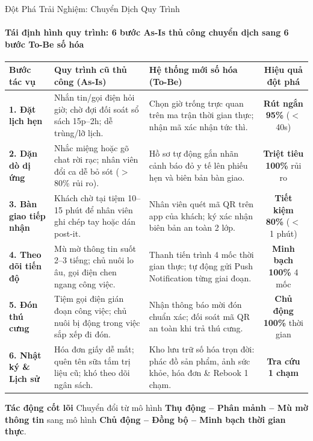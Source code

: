 \begin{frame}{Đột Phá Trải Nghiệm: Chuyển Dịch Quy Trình}
  \framesubtitle{\color{PetcareSecondary}\textbf{Tái định hình quy trình: 6 bước As-Is thủ công chuyển dịch sang 6 bước To-Be số hóa}}

  \begin{table}
    \centering
    \tiny
    \renewcommand{\arraystretch}{1.25}
    \begin{tabularx}{\textwidth}{|l|X|X|c|}
      \hline
      \rowcolor{PetcarePrimary!15}
      \textbf{Bước tác vụ} & \textbf{Quy trình cũ thủ công (As-Is)} & \textbf{Hệ thống mới số hóa (To-Be)} & \textbf{Hiệu quả đột phá} \\ \hline
      \textbf{1. Đặt lịch hẹn} & Nhắn tin/gọi điện hỏi giờ; chờ đợi đối soát sổ sách 15p--2h; dễ trùng/lỡ lịch. & Chọn giờ trống trực quan trên ma trận thời gian thực; nhận mã xác nhận tức thì. & \textbf{\color{PetcareSuccess}Rút ngắn 95\%} ($<$ 40s) \\ \hline
      \textbf{2. Dặn dò dị ứng} & Nhắc miệng hoặc gõ chat rời rạc; nhân viên đổi ca dễ bỏ sót ($>$ 80\% rủi ro). & Hồ sơ tự động gắn nhãn cảnh báo đỏ y tế lên phiếu hẹn và biên bản bàn giao. & \textbf{\color{PetcareSuccess}Triệt tiêu 100\%} rủi ro \\ \hline
      \textbf{3. Bàn giao tiếp nhận} & Khách chờ tại tiệm 10--15 phút để nhân viên ghi chép tay hoặc dán post-it. & Nhân viên quét mã QR trên app của khách; ký xác nhận biên bản an toàn 2 lớp. & \textbf{\color{PetcareSuccess}Tiết kiệm 80\%} ($<$ 1 phút) \\ \hline
      \textbf{4. Theo dõi tiến độ} & Mù mờ thông tin suốt 2--3 tiếng; chủ nuôi lo âu, gọi điện chen ngang công việc. & Thanh tiến trình 4 mốc thời gian thực; tự động gửi Push Notification từng giai đoạn. & \textbf{\color{PetcareSuccess}Minh bạch 100\%} 4 mốc \\ \hline
      \textbf{5. Đón thú cưng} & Tiệm gọi điện gián đoạn công việc; chủ nuôi bị động trong việc sắp xếp đi đón. & Nhận thông báo mời đón chuẩn xác; đối soát mã QR an toàn khi trả thú cưng. & \textbf{\color{PetcareSuccess}Chủ động 100\%} thời gian \\ \hline
      \textbf{6. Nhật ký \& Lịch sử} & Hóa đơn giấy dễ mất; quên tên sữa tắm trị liệu cũ; khó theo dõi ngân sách. & Kho lưu trữ số hóa trọn đời: phác đồ sản phẩm, ảnh sức khỏe, hóa đơn \& Rebook 1 chạm. & \textbf{\color{PetcareSuccess}Tra cứu 1 chạm} \\ \hline
    \end{tabularx}
  \end{table}

  \vspace{1mm}
  \begin{block}{\centering \scriptsize \textbf{Tác động cốt lõi}}
    \centering \tiny
    Chuyển đổi từ mô hình \textbf{Thụ động -- Phân mảnh -- Mù mờ thông tin} sang mô hình \textbf{Chủ động -- Đồng bộ -- Minh bạch thời gian thực}.
  \end{block}
\end{frame}
